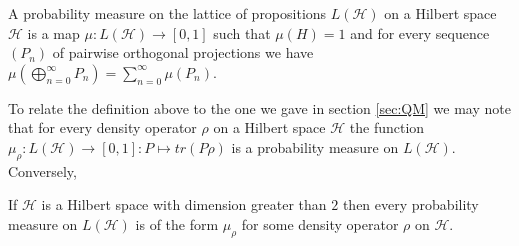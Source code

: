 \begin{definition}
A probability measure on the lattice of propositions $L(\mathcal{H})$ on a Hilbert space $\mathcal{H}$ is a map $\mu:L(\mathcal{H})\to [0,1]$ such that $\mu(H)=1$ and for every sequence $(P_n)$ of pairwise orthogonal projections we have $\mu(\bigoplus_{n=0}^{\infty}P_n)=\sum_{n=0}^{\infty}\mu(P_n)$. 
\end{definition} 

To relate the definition above to the one we gave in section \ref{sec:QM} we may note that for every density operator $\rho$ on a Hilbert space $\mathcal{H}$ the function $\mu_\rho:L(\mathcal{H})\to [0,1]:P\mapsto tr(P\rho)$ is a probability measure on $L(\mathcal{H})$. Conversely,

\begin{theorem}
If $\mathcal{H}$ is a Hilbert space with dimension greater than $2$ then every probability measure on $L(\mathcal{H})$ is of the form $\mu_\rho$ for some density operator $\rho$ on $\mathcal{H}$.
\end{theorem}